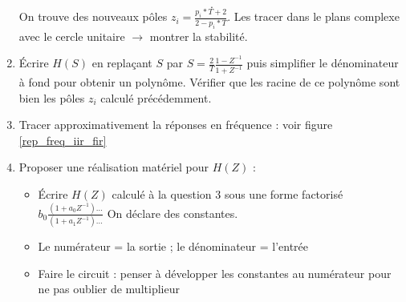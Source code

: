 \documentclass[9pt]{article}
\begin{document}
\begin{multicols}{3}
\begin{enumerate}
\[    .\]
    On trouve des nouveaux pôles $ z_i = \frac{p_i*T + 2}{2 - p_i *T} $. Les tracer dans le plans complexe avec le cercle unitaire $\rightarrow$ montrer la stabilité.
    \item Écrire $ H(S) $ en replaçant $ S $ par $ S = \frac{2}{T} \frac{1 - Z^{-1}}{1 + Z^{-1}} $ puis simplifier le dénominateur à fond pour obtenir un polynôme. Vérifier que les racine de ce polynôme sont bien les pôles $ z_i $ calculé précédemment.
    \item Tracer approximativement la réponses en fréquence : voir figure \ref{rep_freq_iir_fir}
    \item Proposer une réalisation matériel pour $ H(Z) $ : 
        \begin{itemize}
            \item Écrire $ H(Z) $ calculé à la question 3 sous une forme factorisé $ b_0 \frac{(1+ a_0 Z^{-1})\dots}{(1 + a_1 Z^{-1})\dots} $ On déclare des constantes. 
            \item Le numérateur = la sortie ; le dénominateur = l'entrée
            \item Faire le circuit : penser à développer les constantes au numérateur pour ne pas oublier de multiplieur
        \end{itemize}
\end{enumerate}


\end{multicols}
\end{document}
